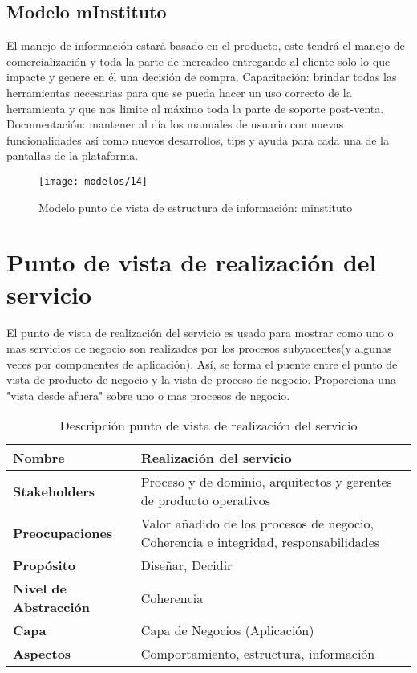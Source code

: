     \subsection{Modelo mInstituto}
    El manejo de información estará basado en el producto, este tendrá el manejo de comercialización y toda la parte de mercadeo entregando al cliente solo lo que impacte y genere en él una decisión de compra. Capacitación: brindar todas las herramientas necesarias para que se pueda hacer un uso correcto de la herramienta y que nos limite al máximo toda la parte de soporte post-venta. Documentación: mantener al día los manuales de usuario con nuevas funcionalidades así como nuevos desarrollos, tips y ayuda para cada una de la pantallas de la plataforma.
    
    \begin{figure}[H]
    	\centering
    	\texttt{[image: modelos/14]}
    	\captionsetup{width=.95\textwidth}
    	\caption{Modelo punto de vista de estructura de información: minstituto}
    	\label{modelo14}
    \end{figure}
    
\section{Punto de vista de realización del servicio}
El punto de vista de realización del servicio es usado para mostrar como uno o mas servicios de negocio son realizados por los procesos subyacentes(y algunas veces por componentes de aplicación). Así, se forma el puente entre el punto de vista de producto de negocio y la vista de proceso de negocio. Proporciona una "vista desde afuera" sobre uno o mas procesos de negocio.
    
    \begin{table}[H]
    	\centering
    	\begin{tabular}{lp{8cm}}
    		\toprule
    		\textbf{Nombre} & \textbf{Realización del servicio} \\
    		\midrule
    		\textbf{Stakeholders} & Proceso y de dominio, arquitectos y gerentes de producto operativos \\
    		\textbf{Preocupaciones} & Valor añadido de los procesos de negocio, Coherencia e integridad,
    		responsabilidades \\
    		\textbf{Propósito} & Diseñar, Decidir \\
    		\textbf{Nivel de Abstracción} & Coherencia \\
    		\textbf{Capa} & Capa de Negocios (Aplicación) \\
    		\textbf{Aspectos} & Comportamiento, estructura, información \\
    		\bottomrule
    	\end{tabular}
    	\captionsetup{width=.95\textwidth}
    	\caption{Descripción punto de vista de realización del servicio}
    	\label{tabla18}
    \end{table}
    
